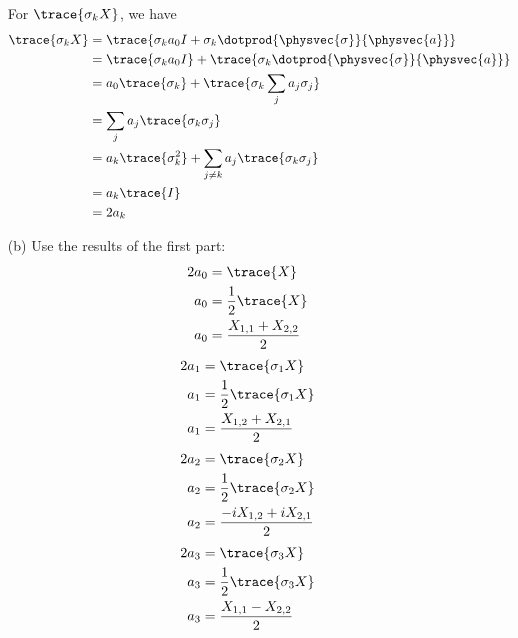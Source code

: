 \begin{itemize}
  For $\trace{\sigma_k X}$, we have
  \begin{align*}
    \trace{\sigma_k X} &= \trace{\sigma_k a_0I +
      \sigma_k\dotprod{\physvec{\sigma}}{\physvec{a}}} \\
    &= \trace{\sigma_k a_0I} +
      \trace{\sigma_k\dotprod{\physvec{\sigma}}{\physvec{a}}} \\
    &= a_0\trace{\sigma_k} +
      \trace{\sigma_k\sum_j a_j\sigma_j} \\
    &= \sum_j a_j\trace{\sigma_k\sigma_j} \\
    &= a_k\trace{\sigma_k^2} + \sum_{j\neq k} a_j\trace{\sigma_k\sigma_j} \\
    &= a_k\trace{I} \\
    &= 2a_k \\
  \end{align*}
\item[(b)] Use the results of the first part:
  \begin{align*}
    2a_0 &= \trace{X} \\
    a_0 &= \frac{1}{2}\trace{X} \\
    a_0 &= \frac{X_{1,1} + X_{2,2}}{2}
  \end{align*}
  \begin{align*}
    2a_1 &= \trace{\sigma_1 X} \\
    a_1 &= \frac{1}{2}\trace{\sigma_1 X} \\
    a_1 &= \frac{X_{1,2} + X_{2,1}}{2}
  \end{align*}
  \begin{align*}
    2a_2 &= \trace{\sigma_2 X} \\
    a_2 &= \frac{1}{2}\trace{\sigma_2 X} \\
    a_2 &= \frac{-iX_{1,2} + iX_{2,1}}{2}
  \end{align*}
  \begin{align*}
    2a_3 &= \trace{\sigma_3 X} \\
    a_3 &= \frac{1}{2}\trace{\sigma_3 X} \\
    a_3 &= \frac{X_{1,1} - X_{2,2}}{2}
  \end{align*}
\end{itemize}

